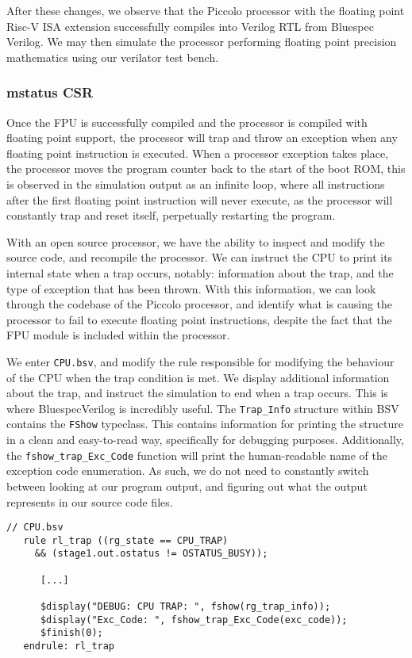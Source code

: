 \documentclass[a4paper,8pt]{report}
\begin{document}
After these changes, we observe that the Piccolo processor with the
floating point Risc-V ISA extension successfully compiles into Verilog RTL from
Bluespec Verilog. We may then simulate the processor performing floating point
precision mathematics using our verilator test bench.

\subsubsection{mstatus CSR}
Once the FPU is successfully compiled and the processor is compiled with
floating point support, the processor will trap and throw an exception when any
floating point instruction is executed. When a processor exception takes place,
the processor moves the program counter back to the start of the boot ROM, this
is observed in the simulation output as an infinite loop, where all instructions
after the first floating point instruction will never execute, as the processor
will constantly trap and reset itself, perpetually restarting the program.

With an open source processor, we have the ability to inspect and modify the
source code, and recompile the processor. We can instruct the CPU to print its
internal state when a trap occurs, notably: information about the trap, and the
type of exception that has been thrown. With this information, we can look
through the codebase of the Piccolo processor, and identify what is causing the
processor to fail to execute floating point instructions, despite the fact that
the FPU module is included within the processor.

We enter \texttt{CPU.bsv}, and modify the rule responsible for modifying the
behaviour of the CPU when the trap condition is met. We display additional
information about the trap, and instruct the simulation to end when a trap
occurs. This is where BluespecVerilog is incredibly useful. The
\texttt{Trap\_Info} structure within BSV contains the \texttt{FShow} typeclass.
This contains information for printing the structure in a clean and easy-to-read
way, specifically for debugging purposes. Additionally, the
\texttt{fshow\_trap\_Exc\_Code} function will print the human-readable name of
the exception code enumeration. As such, we do not need to constantly switch
between looking at our program output, and figuring out what the output
represents in our source code files.

\begin{verbatim}
// CPU.bsv
   rule rl_trap ((rg_state == CPU_TRAP)
     && (stage1.out.ostatus != OSTATUS_BUSY));

      [...]

      $display("DEBUG: CPU TRAP: ", fshow(rg_trap_info));
      $display("Exc_Code: ", fshow_trap_Exc_Code(exc_code));
      $finish(0);
   endrule: rl_trap
\end{verbatim}
\end{document}
